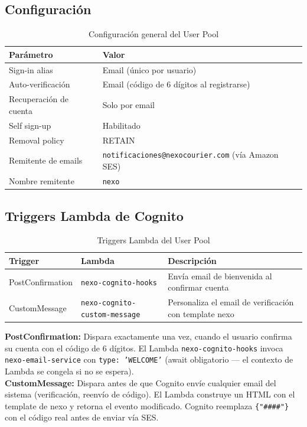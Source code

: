 \documentclass[12pt,a4paper]{article}
\begin{document}
\subsection{Configuración}

\begin{table}[H]
\centering
\begin{tabular}{@{}ll@{}}
\toprule
\textbf{Parámetro} & \textbf{Valor} \\
\midrule
Sign-in alias & Email (único por usuario) \\
Auto-verificación & Email (código de 6 dígitos al registrarse) \\
Recuperación de cuenta & Solo por email \\
Self sign-up & Habilitado \\
Removal policy & RETAIN \\
Remitente de emails & \texttt{notificaciones@nexocourier.com} (vía Amazon SES) \\
Nombre remitente & \texttt{nexo} \\
\bottomrule
\end{tabular}
\caption{Configuración general del User Pool}
\end{table}

\subsection{Triggers Lambda de Cognito}

\begin{table}[H]
\centering
\begin{tabular}{@{}lll@{}}
\toprule
\textbf{Trigger} & \textbf{Lambda} & \textbf{Descripción} \\
\midrule
PostConfirmation & \texttt{nexo-cognito-hooks} & Envía email de bienvenida al confirmar cuenta \\
CustomMessage & \texttt{nexo-cognito-custom-message} & Personaliza el email de verificación con template nexo \\
\bottomrule
\end{tabular}
\caption{Triggers Lambda del User Pool}
\end{table}

\begin{nexobox}
\textbf{PostConfirmation:} Dispara exactamente una vez, cuando el usuario confirma
su cuenta con el código de 6 dígitos. El Lambda \texttt{nexo-cognito-hooks} invoca
\texttt{nexo-email-service} con \texttt{type: 'WELCOME'} (await obligatorio ---
el contexto de Lambda se congela si no se espera).\\[4pt]
\textbf{CustomMessage:} Dispara antes de que Cognito envíe cualquier email del sistema
(verificación, reenvío de código). El Lambda construye un HTML con el template de nexo
y retorna el evento modificado. Cognito reemplaza \texttt{\{"\#\#\#\#"\}} con el código
real antes de enviar vía SES.
\end{nexobox}
\end{document}
